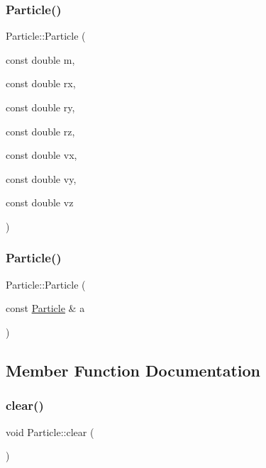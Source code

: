 \subsubsection{\texorpdfstring{Particle()}{Particle()}\hspace{0.1cm}{\footnotesize\ttfamily [3/4]}}
{\footnotesize\ttfamily Particle\+::\+Particle (\begin{DoxyParamCaption}\item[{const double}]{m,  }\item[{const double}]{rx,  }\item[{const double}]{ry,  }\item[{const double}]{rz,  }\item[{const double}]{vx,  }\item[{const double}]{vy,  }\item[{const double}]{vz }\end{DoxyParamCaption})\hspace{0.3cm}{\ttfamily [inline]}}

\hypertarget{classParticle_a602b45f0258d4e61d9c07f2c91d4f497}{}\label{classParticle_a602b45f0258d4e61d9c07f2c91d4f497} 
\subsubsection{\texorpdfstring{Particle()}{Particle()}\hspace{0.1cm}{\footnotesize\ttfamily [4/4]}}
{\footnotesize\ttfamily Particle\+::\+Particle (\begin{DoxyParamCaption}\item[{const \hyperlink{classParticle}{Particle} \&}]{a }\end{DoxyParamCaption})\hspace{0.3cm}{\ttfamily [inline]}}



\subsection{Member Function Documentation}
\hypertarget{classParticle_ab0eea4368ee797652c528949ab4ac563}{}\label{classParticle_ab0eea4368ee797652c528949ab4ac563} 
\subsubsection{\texorpdfstring{clear()}{clear()}}
{\footnotesize\ttfamily void Particle\+::clear (\begin{DoxyParamCaption}{ }\end{DoxyParamCaption})\hspace{0.3cm}{\ttfamily [inline]}}


